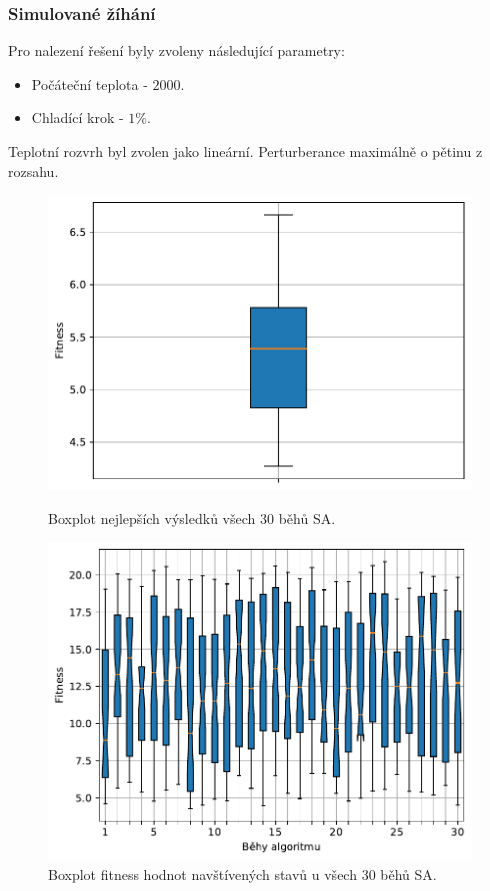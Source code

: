 \subsubsection{Simulované žíhání}
Pro nalezení řešení byly zvoleny následující parametry:
\begin{itemize}
    \item Počáteční teplota - $2000$.
    \item Chladící krok - $1\%$.
\end{itemize}
Teplotní rozvrh byl zvolen jako lineární. Perturberance maximálně o pětinu z rozsahu.

\begin{figure}[H]
\begin{minipage}[t]{0.475\linewidth}
\includegraphics[width=\linewidth]{obrazky-figures/statistics/Benchmarks/Ackley/SA/bestsBoxplot_WithOutliers.pdf}
\caption{Boxplot nejlepších výsledků všech $30$ běhů SA.}
\label{fg:bench:ackley:sa:best}
\end{minipage}
\hfill
\begin{minipage}[t]{0.475\linewidth}
\includegraphics[width=\linewidth]{obrazky-figures/statistics/Benchmarks/Ackley/SA/lastGenBoxplots.pdf}
\caption{Boxplot fitness hodnot navštívených stavů u všech $30$ běhů SA.}
\label{fg:bench:ackley:sa:lastGen}
\end{minipage}
\end{figure}

